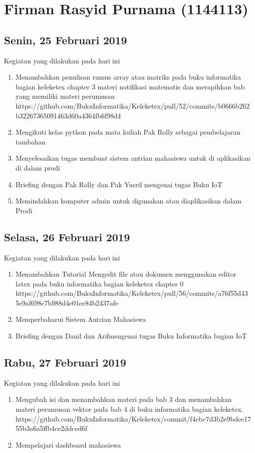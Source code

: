 \chapter{Firman Rasyid Purnama (1144113)}

\section{Senin, 25 Februari 2019}
Kegiatan yang dilakukan pada hari ini
\begin{enumerate}
\item Menambahkan penulisan rumus array atau matriks pada buku informatika bagian keleketex chapter 3 materi notifikasi matematis dan merapihkan bab yang memiliki materi perumusan
\subitem https://github.com/BukuInformatika/Keleketex/pull/52/commits/b0666b262b32267365091463d60a4364fb6f98d4
\item Mengikuti kelas python pada mata kuliah Pak Rolly sebagai pembelajaran tambahan
\item Menyelesaikan tugas membuat sistem antrian mahasiswa untuk di aplikasikan di dalam prodi
\item Briefing dengan Pak Rolly dan Pak Yusril mengenai tugas Buku IoT
\item Memindahkan komputer admin untuk digunakan atau diaplikasikan dalam Prodi
\end{enumerate}

\section{Selasa, 26 Februari 2019}
Kegiatan yang dilakukan pada hari ini
\begin{enumerate}
\item Menambahkan Tutorial Mengedit file atau dokumen menggunakan editor latex pada buku informatika bagian keleketex chapter 0
\subitem https://github.com/BukuInformatika/Keleketex/pull/56/commits/a76f55d435e9af698c7b988d4e01ee84b2437afe
\item Memperbaharui Sistem Antrian Mahasiswa
\item Briefing dengan Danil dan Arifmengenai tugas Buku Informatika bagian IoT
\end{enumerate}

\section{Rabu, 27 Februari 2019}
Kegiatan yang dilakukan pada hari ini
\begin{enumerate}
\item Mengubah isi dan menambahkan materi pada bab 3  dan menambahkan materi perumusan vektor pada bab 4 di buku informatika bagian keleketex.
\subitem https://github.com/BukuInformatika/Keleketex/commit/f4ebc7d3b2e9bdee1755b3a6a5ffb4ce2ddced6f
\item Mempelajari dashboard mahasiswa
\end{enumerate}

